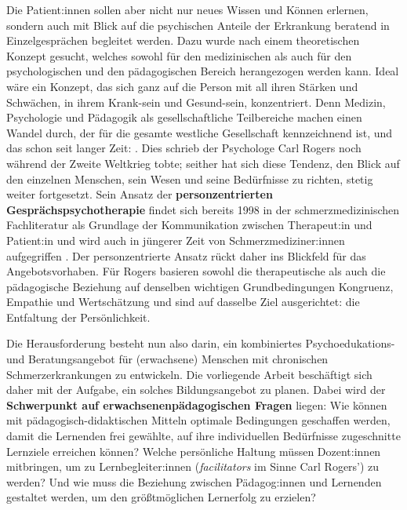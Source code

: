 \documentclass[
  twoside,
  parskip=half-,
  paper=176mm:246mm,
  BCOR=14mm,
  DIV=14,
]{scrreprt}
\begin{document}
    Die Patient:innen sollen aber nicht nur neues Wissen und Können erlernen, sondern auch mit Blick auf die psychischen Anteile der Erkrankung beratend in Einzelgesprächen begleitet werden. Dazu wurde nach einem theoretischen Konzept gesucht, welches sowohl für den medizinischen als auch für den psychologischen und den pädagogischen Bereich herangezogen werden kann. Ideal wäre ein Konzept, das sich ganz auf die Person mit all ihren Stärken und Schwächen, in ihrem Krank-sein und Gesund-sein, konzentriert. Denn Medizin, Psychologie und Pädagogik als gesellschaftliche Teilbereiche machen einen Wandel durch, der für die gesamte westliche Gesellschaft kennzeichnend ist, und das schon seit langer Zeit: . Dies schrieb der Psychologe Carl Rogers noch während der Zweite Weltkrieg tobte; seither hat sich diese Tendenz, den Blick auf den einzelnen Menschen, sein Wesen und seine Bedürfnisse zu richten, stetig weiter fortgesetzt. Sein Ansatz der \textbf{personzentrierten Gesprächspsychotherapie} findet sich bereits 1998 in der schmerzmedizinischen Fachliteratur als Grundlage der Kommunikation zwischen Therapeut:in und Patient:in \autocite[vgl.][62-65]{schmerztherapie} und wird auch in jüngerer Zeit von Schmerzmediziner:innen aufgegriffen \autocite[vgl.][]{fussnegger}.
    Der personzentrierte Ansatz rückt daher ins Blickfeld für das Angebotsvorhaben. Für Rogers basieren sowohl die therapeutische als auch die pädagogische Beziehung auf denselben wichtigen Grundbedingungen Kongruenz, Empathie und Wertschätzung und sind auf dasselbe Ziel ausgerichtet: die Entfaltung der Persönlichkeit. 

Die Herausforderung besteht nun also darin, ein kombiniertes Psychoedukations- und Beratungsangebot für (erwachsene) Menschen mit chronischen Schmerzerkrankungen zu entwickeln. Die vorliegende Arbeit beschäftigt sich daher mit der Aufgabe, ein solches Bildungsangebot zu planen. Dabei wird der \textbf{Schwerpunkt auf erwachsenenpädagogischen Fragen} liegen: Wie können mit pädagogisch-didaktischen Mitteln optimale Bedingungen geschaffen werden, damit die Lernenden frei gewählte, auf ihre individuellen Bedürfnisse zugeschnitte Lernziele erreichen können? Welche persönliche Haltung müssen Dozent:innen mitbringen, um zu Lernbegleiter:innen (\textit{facilitators} im Sinne Carl Rogers') zu werden? Und wie muss die Beziehung zwischen Pädagog:innen und Lernenden gestaltet werden, um den größtmöglichen Lernerfolg zu erzielen?
\end{document}
